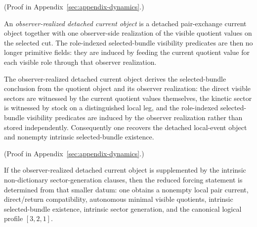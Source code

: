 (Proof in Appendix~\ref{sec:appendix-dynamics}.)

\begin{definition}
\label{def:observer-realized-detached-current-object}
An \emph{observer-realized detached current object} is a detached
pair-exchange current object together with one observer-side realization of the
visible quotient values on the selected cut. The role-indexed selected-bundle
visibility predicates are then no longer primitive fields: they are induced by
feeding the current quotient value for each visible role through that observer
realization.
\end{definition}

\begin{theorem}
\label{thm:observer-realized-detached-current-object-derives-selected-bundle-surface}
The observer-realized detached current object derives the selected-bundle
conclusion from the quotient object and its observer realization: the direct
visible sectors are witnessed by the current quotient values themselves, the
kinetic sector is witnessed by stock on a distinguished local leg, and the
role-indexed selected-bundle visibility predicates are induced by the observer
realization rather than stored independently. Consequently one recovers the
detached local-event object and nonempty intrinsic selected-bundle existence.
\end{theorem}

(Proof in Appendix~\ref{sec:appendix-dynamics}.)

\begin{corollary}
\label{cor:observer-realized-detached-current-sector-object-closes-the-reduced-seam}
If the observer-realized detached current object is supplemented by the
intrinsic non-dictionary sector-generation clauses, then the reduced forcing
statement is determined from that smaller datum: one obtains a nonempty local
pair current, direct/return compatibility, autonomous minimal visible
quotients, intrinsic selected-bundle existence, intrinsic sector generation,
and the canonical logical profile \([3,2,1]\).
\end{corollary}

